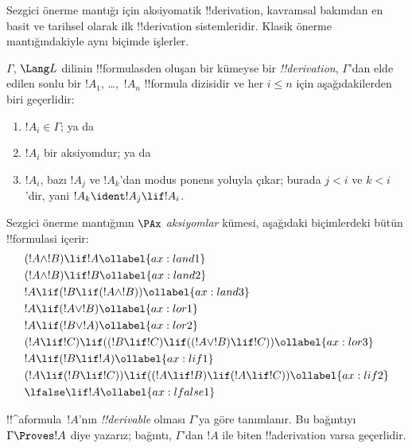 \documentclass[../../../include/open-logic-section]{subfiles}
\begin{document}


Sezgici önerme mantığı için aksiyomatik !!{derivation}, kavramsal bakımdan en
basit ve tarihsel olarak ilk !!{derivation} sistemleridir. Klasik önerme
mantığındakiyle aynı biçimde işlerler.

\begin{defn}[!!^{derivability}]
$\Gamma$, $\Lang L$ dilinin !!{formula}s{}den oluşan bir kümeyse bir
\emph{!!{derivation}}, $\Gamma$'dan elde edilen sonlu bir $!A_1$, \dots,~$!A_n$ !!{formula}
dizisidir ve her $i \le n$ için aşağıdakilerden biri geçerlidir:
\begin{enumerate}
\item $!A_i \in \Gamma$; ya da
\item $!A_i$ bir aksiyomdur; ya da
\item $!A_i$, bazı $!A_j$ ve $!A_k$'dan modus ponens yoluyla çıkar; burada
  $j < i$ ve $k < i$'dir, yani $!A_k \ident !A_j \lif !A_i$.
\end{enumerate}
\end{defn}

\begin{defn}[Aksiyomlar]
Sezgici önerme mantığının $\PAx$ \emph{aksiyomlar} kümesi, aşağıdaki
biçimlerdeki bütün !!{formula}s{}i içerir:
\begin{align}
  & (!A \land !B) \lif !A \ollabel{ax:land1}\\
  & (!A \land !B) \lif !B \ollabel{ax:land2}\\
  & !A \lif (!B \lif (!A \land !B)) \ollabel{ax:land3}\\
  & !A \lif (!A \lor !B) \ollabel{ax:lor1}\\
  & !A \lif (!B \lor !A) \ollabel{ax:lor2}\\
  & (!A \lif !C) \lif ((!B \lif !C) \lif ((!A \lor !B) \lif !C)) \ollabel{ax:lor3}\\
  & !A \lif (!B \lif !A) \ollabel{ax:lif1}\\
  & (!A \lif (!B \lif !C)) \lif ((!A \lif !B) \lif (!A \lif !C)) \ollabel{ax:lif2}\\
  & \lfalse \lif !A \ollabel{ax:lfalse1}
\end{align}
\end{defn}

\begin{defn}[!!^{derivability}]
!!^a{formula}~$!A$'nın \emph{!!{derivable}} olması $\Gamma$'ya göre
tanımlanır. Bu bağıntıyı $\Gamma \Proves !A$ diye yazarız; bağıntı,
$\Gamma$'dan $!A$ ile biten !!a{derivation} varsa geçerlidir.
\end{defn}
\end{document}
